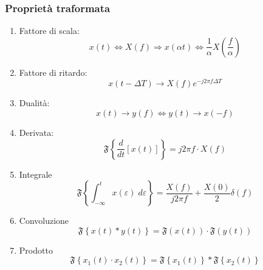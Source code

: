 \subsubsection*{Proprietà traformata}
\begin{enumerate}
	\item Fattore di scala:
	      \[
		      x\left(t\right) \Leftrightarrow X\left(f\right) \Rightarrow x\left(\alpha t\right) \Leftrightarrow \frac{1}{\alpha }X \left(\frac{f}{\alpha} \right)
	      \]
	\item Fattore di ritardo:
	      \[
		      x\left(t - \Delta T \right) \rightarrow X\left(f\right)e^{-j2 \pi f \Delta T }
	      \]
	\item Dualità:
	      \[
		      x\left(t\right) \rightarrow y\left(f\right) \Leftrightarrow y\left(t\right) \rightarrow  x\left(-f\right)
	      \]
	\item Derivata:
	      \[
		      \mathfrak{F}\left\{ \frac{d}{dt} \left[x\left(t\right)\right]\right\} = j 2 \pi f \cdot X\left(f\right)
	      \]
	\item Integrale
	      \[
		      \mathfrak{F}\left\{\int_{-\infty }^{t} x\left(\varepsilon \right) \; d\varepsilon \right\} = \frac{X\left(f\right)}{j 2 \pi  f} + \frac{X\left(0\right)}{2} \delta \left(f\right)
	      \]
	\item Convoluzione
	      \[
		      \mathfrak{F} \left\{x\left(t\right)* y\left(t\right)\right\} = \mathfrak{F}\left(x\left(t\right)\right) \cdot \mathfrak{F}\left(y\left(t\right)\right)
	      \]
	\item Prodotto
	      \[
		      \mathfrak{F} \left\{x_1\left(t\right) \cdot  x_2\left(t\right)\right\} = \mathfrak{F} \left\{x_1\left(t\right)\right\} * \mathfrak{F} \left\{x_2\left(t\right)\right\}
	      \]
\end{enumerate}
